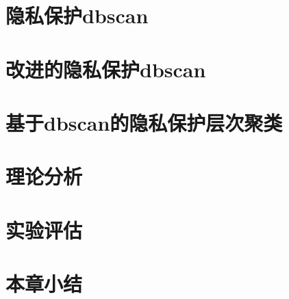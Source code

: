 \section{隐私保护dbscan}
\label{s4-t1}

\section{改进的隐私保护dbscan}
\label{s4-t2}
\section{基于dbscan的隐私保护层次聚类}
\label{s4-t3}
\section{理论分析}
\label{s4-lilun}
\section{实验评估}
\label{s4-shiyan}
\section{本章小结}
\label{s4-xiaojie}